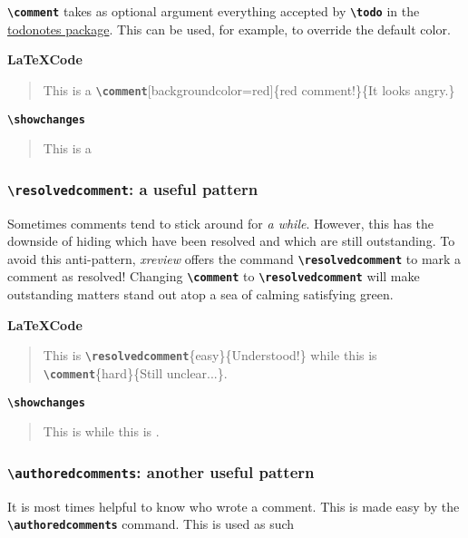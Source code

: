 \documentclass[a4paper]{ltxdoc}
\newcommand{\writecommand}[1]{\texttt{\textbf{{\textbackslash#1}}}}
\newcommand{\writearg}[1]{\{#1\}}
\begin{document}
\writecommand{comment} takes as optional argument everything accepted by \writecommand{todo} in the \href{https://ctan.org/pkg/todonotes?lang=en}{todonotes package}. This can be used, for example, to override the default color.

\textbf{\LaTeX Code}

\begin{quote}
    This is a \writecommand{comment}[backgroundcolor=red]\writearg{red comment!}\writearg{It looks angry.}
\end{quote}

\writecommand{showchanges}
\showchanges

\begin{quote}
This is a 
\end{quote}


\subsubsection{\writecommand{resolvedcomment}: a useful pattern}

Sometimes comments tend to stick around for \textit{a while}. However, this has the downside of hiding which have been resolved and which are still outstanding. 
To avoid this anti-pattern, \textit{xreview} offers the command \writecommand{resolvedcomment} to mark a comment as resolved!
Changing \writecommand{comment} to \writecommand{resolvedcomment} will make outstanding matters stand out atop a sea of calming satisfying green.

\textbf{\LaTeX Code}

\begin{quote}
    This is \writecommand{resolvedcomment}\writearg{easy}\writearg{Understood!} while this is \writecommand{comment}\writearg{hard}\writearg{Still unclear...}.
\end{quote}

\writecommand{showchanges}
\showchanges

\begin{quote}
This is  while this is .
\end{quote}

\subsubsection{\writecommand{authoredcomments}: another useful pattern}

It is most times helpful to know who wrote a comment. This is made easy by the \writecommand{authoredcomments} command. This is used as such 
\end{document}
